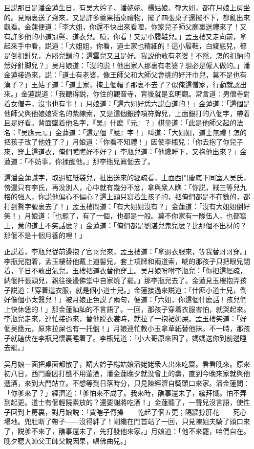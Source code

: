 且説那日是潘金蓮生日，有吴大妗子、潘姥姥、楊姑娘、郁大姐，都在月娘上房坐的。見廟裏送了齋來，又是許多羹果插桌禮物，擺了四張桌子還擺不下，都亂出來觀看。金蓮便道：「李大姐，你還不快出來看哩，你家兒子師父廟裏送禮來了！又有許多他的小道冠髻、道衣兒。噫，你看！又是小履鞋兒。」孟玉樓又走向前，拿起來手中看，説道：「大姐姐，你看，道士家也精細的！這小履鞋，白綾底兒，都是倒扣針兒，方勝兒鎖的；這雲兒又且是好。我説他敢有老婆！不然，怎的扣納的恁好針脚兒？」吴月娘道：「沒的説！他出家人那裏有老婆？想必是僱人做的。」潘金蓮接過來，説：「道士有老婆，像王師父和大師父會挑的好汗巾兒，莫不是也有漢子？」王姑子道：「道士家，掩上個帽子那裏不去了？似俺這僧家，行動就認出來。」金蓮説道：「我聽得説，你住的觀音寺，背後就是玄明觀。常言道：男僧寺對着女僧寺，沒事也有事！」月娘道：「這六姐好恁六説白道的！」金蓮道：「這個是他師父與他娘娘寄名的紫線索，又是這個銀脖項符牌兒，上面銀打的八個字，帶着且是好看。背面墜着他名字，『吴』什麽『元』？」棋童道：「此是他師父起的法名：『吴應元』。」金蓮道：「這是個『應』字！」叫道：「大姐姐，道士無禮！怎的把孩子改了他姓了？」月娘道：「你看不知禮！」因使李瓶兒：「你去抱了你兒子來，穿上這道衣，俺們瞧瞧好不好？」李瓶兒道：「他纔睡下，又抱他出來？」金蓮道：「不妨事，你揉醒他。」那李瓶兒眞個去了。

這潘金蓮識字，取過紅紙袋兒，扯出送來的經疏看，上面西門慶底下同室人吴氏，傍邊只有李氏，再没別人，心中就有幾分不忿，拿與衆人瞧：「你説，賊三等兒九格的強人，你説他偏心不偏心？這上頭只寫着生孩子的，把俺們都是不在數的，都打到贅字號裏去了！」孟玉樓問道：「有大姐姐沒有？」金蓮道：「沒有大姐姐倒好笑！」月娘道：「也罷了，有了一個，也都是一般。莫不你家有一隊伍人，也都寫上，惹的道士不笑話麽？」金蓮道：「俺們都是劉湛兒鬼兒麽？比那個不出材的？那個不是十個月養的哩！」

正説着，李瓶兒従前邊抱了官哥兒來，孟玉樓道：「拿過衣服來，等我替哥哥穿。」李瓶兒抱着，孟玉樓替他戴上道髻兒，套上項牌和兩道索，唬的那孩子只把眼兒閉着，半日不敢出氣兒。玉樓把道衣替他穿上。吴月娘吩咐李瓶兒：「你把這經疏，納個阡張頭兒，親往後邊佛堂中自家燒了罷。」那李瓶兒去了。金蓮見玉樓抱弄孩子説道：「穿着這衣服，就是個小道士兒。」金蓮接過來説道：「什麽小道士兒，倒好像個小太醫兒！」被月娘正色説了兩句，便道：「六姐，你這個什麽話！孩兒們上快休恁的！」那金蓮訕訕的不言語了。一回，那孩子穿着衣服害怕，就哭起來。李瓶兒走來，連忙接過來，替他脱衣裳時，就拉了一抱裙奶屎。孟玉樓笑道：「好個吴應元，原來拉屎也有一托盤！」月娘連忙教小玉拿草紙替他抹。不一時，那孩子就磕伏在李瓶兒懷裏睡着了。李瓶兒道：「小大哥原來困了，媽媽送你到前邊睡去罷。」

吴月娘一面把桌面都散了，請大妗子楊姑娘潘姥姥衆人出來吃齋。看看晚來。原來初八日，西門慶因打醮不用葷酒，潘金蓮晚夕就没曾上的壽，直到今晚來家就與他遞酒，來到大門站立。不想等到日落時分，只見陳經濟自騎頭口來家。潘金蓮問：「你爹來了？」經濟道：「爹怕來不成了。我來時，醮事還未了，纔拜懺。怕不弄到起更。道士有個輕饒素放的？還要謝將吃酒！」金蓮聽了，一聲兒沒言語，使性子回到上房裏，對月娘説：「賈瞎子傳操——乾起了個五更；隔牆掠肝花——死心塌地。兜肚断了帶子——沒得絆了！剛纔在門首站了一回，只見陳姐夫騎了頭口來了，説爹不來了，醮事還未了，先打發他來家。」月娘道：「他不來罷，咱們自在。晚夕聽大師父王師父説因果，唱佛曲兒。」

